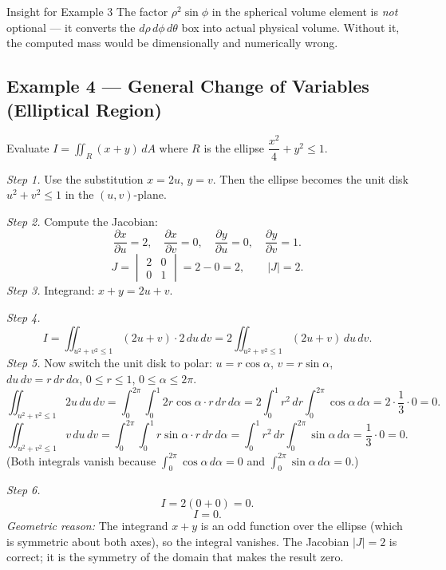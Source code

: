 \documentclass[12pt,a4paper]{article}
\begin{document}
\begin{learnbox}{Insight for Example 3}
The factor $\rho^2\sin\phi$ in the spherical volume element is \emph{not} optional --- it converts
the $d\rho\,d\phi\,d\theta$ box into actual physical volume. Without it, the computed mass would be
dimensionally and numerically wrong.
\end{learnbox}

\subsection*{Example 4 --- General Change of Variables (Elliptical Region)}

Evaluate $\displaystyle I = \iint_R (x + y)\,dA$ where $R$ is the ellipse $\dfrac{x^2}{4} + y^2 \leq 1$.

\textit{Step 1.}  Use the substitution $x = 2u$, $y = v$. Then the ellipse becomes the unit disk
$u^2 + v^2 \leq 1$ in the $(u,v)$-plane.

\textit{Step 2.}  Compute the Jacobian:
\[
  \frac{\partial x}{\partial u} = 2,\quad \frac{\partial x}{\partial v} = 0,\quad
  \frac{\partial y}{\partial u} = 0,\quad \frac{\partial y}{\partial v} = 1.
\]
\[
  J = \begin{vmatrix} 2 & 0 \\ 0 & 1 \end{vmatrix} = 2 - 0 = 2, \qquad |J| = 2.
\]
\textit{Step 3.}  Integrand: $x + y = 2u + v$.

\textit{Step 4.}
\[
  I = \iint_{u^2+v^2 \leq 1} (2u + v) \cdot 2\,du\,dv
    = 2\iint_{u^2+v^2\leq1} (2u + v)\,du\,dv.
\]
\textit{Step 5.}  Now switch the unit disk to polar: $u = r\cos\alpha$, $v = r\sin\alpha$,
$du\,dv = r\,dr\,d\alpha$, $0 \leq r \leq 1$, $0 \leq \alpha \leq 2\pi$.
\[
  \iint_{u^2+v^2\leq1}2u\,du\,dv
  = \int_0^{2\pi}\int_0^1 2r\cos\alpha \cdot r\,dr\,d\alpha
  = 2\int_0^1 r^2\,dr \int_0^{2\pi}\cos\alpha\,d\alpha
  = 2 \cdot \frac{1}{3} \cdot 0 = 0.
\]
\[
  \iint_{u^2+v^2\leq1}v\,du\,dv
  = \int_0^{2\pi}\int_0^1 r\sin\alpha \cdot r\,dr\,d\alpha
  = \int_0^1 r^2\,dr \int_0^{2\pi}\sin\alpha\,d\alpha
  = \frac{1}{3}\cdot 0 = 0.
\]
(Both integrals vanish because $\int_0^{2\pi}\cos\alpha\,d\alpha = 0$ and
$\int_0^{2\pi}\sin\alpha\,d\alpha = 0$.)

\textit{Step 6.}
\[
  I = 2(0 + 0) = 0.
\]
\[
  \boxed{I = 0.}
\]
\textit{Geometric reason:} The integrand $x+y$ is an odd function over the ellipse (which is symmetric
about both axes), so the integral vanishes. The Jacobian $|J|=2$ is correct; it is the symmetry of
the domain that makes the result zero.
\end{document}
